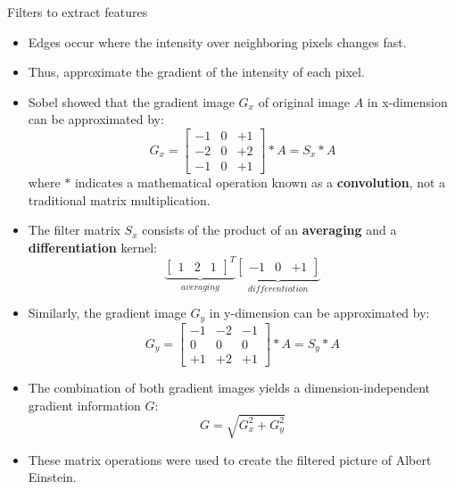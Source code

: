 \begin{vbframe}{Filters to extract features}
\begin{itemize}
\item Edges occur where the intensity over neighboring pixels changes fast.
\item Thus, approximate the gradient of the intensity of each pixel.
\item Sobel showed that the gradient image $G_x$ of original image $A$ in x-dimension  can be approximated by:
$$G_x = 
\begin{bmatrix}
-1 & 0 & +1 \\
-2 & 0 & +2 \\
-1 & 0 & +1 
\end{bmatrix} * A = S_x * A
$$
where $*$ indicates a mathematical operation known as a \textbf{convolution}, not a traditional matrix multiplication.
\item The filter matrix $S_x$ consists of the product of an \textbf{averaging} and a \textbf{differentiation} kernel: 
$$
\underbrace{\begin{bmatrix}
1 & 2 & 1   
\end{bmatrix}^{T}}_{averaging}
\underbrace{\begin{bmatrix}
-1 & 0 & +1   
\end{bmatrix}}_{differentiation}
$$
\end{itemize}
\framebreak
    \begin{itemize}
        \item Similarly, the gradient image $G_y$ in y-dimension can be approximated by:
        $$
            G_y = 
            \begin{bmatrix}
                -1 & -2 & -1  \\
                0 & 0 & 0 \\
                +1 & +2 & +1
            \end{bmatrix} * A = S_y * A
        $$
        \item The combination of both gradient images yields a dimension-independent gradient information $G$:
        $$
            G = \sqrt{G_x^2 + G_y^2}
        $$
        \item These matrix operations were used to create the filtered picture of Albert Einstein.
    \end{itemize}
\end{vbframe}

